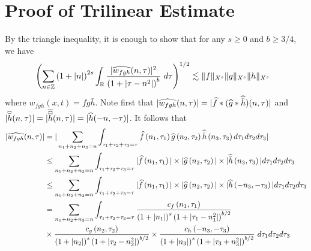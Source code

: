\section{Proof of Trilinear Estimate}
%
%
  By the triangle inequality, it is enough to show that for any $s \ge 0$ and $b
\ge 3/4$, we have
  \begin{equation}
    \label{ptrilin-est-simp}
    \begin{split}
    & \left( \sum_{n \in \mathbb{Z}} \left (1 + |n| \right )^{2s} \int_{\mathbb{R}}
    \frac{|\widehat{{w}_{fgh}}(n, \tau) |^2}{\left (1+ |\tau - 
    n^{2}| \right ) ^b} 
     \ d \tau 
    \right)^{1/2}
    \lesssim \|f\|_{X^s} \| g\|_{X^s}
    \| h \|_{X^s}
  \end{split}
  \end{equation}
  where $w_{fgh}(x,t) = f g \bar{h}$.
%
%
%
%
Note first that $|\widehat{{w}_{fgh}}(n, \tau) |  = | \widehat{f} * ( \widehat{g} 
* \widehat{\bar h})(n, \tau)|$ and $| \widehat{\bar{h}}(n, \tau) | = |\overline{ \widehat{\overline{h}} 
}(n, \tau)| = | \widehat{h}(-n, -\tau) |$. It follows that
%
%
\begin{equation}
  \label{pnon-lin-rep}
  \begin{split}
    | \widehat{{w}_{fgh}}(n, \tau)|
    & = | \sum_{n_1 + n_2 + n_3 = n}  \int_{\tau_1 + \tau_2 + \tau_3 = \tau} \widehat{f}\left( n_1,  \tau_1 
\right) \widehat{g}\left( n_2, \tau_2  
\right) \widehat{\bar h}\left( n_3, \tau_3 \right) d \tau_1 d \tau_2 d \tau_3 |
\\
& \le \sum_{n_1 + n_2 + n_3 = n}  \int_{\tau_1 + \tau_2 + \tau_3 = \tau} | \widehat{f}\left( n_1, \tau_1 
\right) | \times  | \widehat{g}\left( n_2, \tau_2 
\right) | \times | \widehat{\bar h}\left( n_3, \tau_3 \right) | d \tau_1 d \tau_2 d 
\tau_3
\\
& \le \sum_{n_1 + n_2 + n_3 = n}  \int_{\tau_1 + \tau_2 + \tau_3 = \tau} | \widehat{f}\left( n_1, \tau_1 
\right) | \times | \widehat{g}\left( n_2, \tau_2 
\right) | \times | \widehat{h}\left( -n_3, - \tau_3 \right) | d \tau_1 d \tau_2 d 
\tau_3
\\
& = \sum_{n_1 + n_2 + n_3 = n} \int_{\tau_1 + \tau_2 + \tau_3 = \tau} \frac{c_f\left( n_1, \tau_1 
\right)}{\left (1 + |n_1| \right )^s \left( 1 + | \tau_1 - n_1^2 | \right)^{b/2}}
\\
& \times \frac{c_{g}\left( n_2, \tau_2 \right)}{\left (1 + |n_2| \right ) 
^s\left( 1 + | \tau_2 -  n_2^2| 
\right)^{b/2}}
 \times \frac{c_{h}\left( -n_3, -\tau_3 \right)}{\left (1 + |n_3| \right ) ^s\left( 1 + | 
\tau_3 + n_3^2 | \right)^{b/2}} \ d \tau_1 d \tau_2 d \tau_3
\end{split}
\end{equation}
